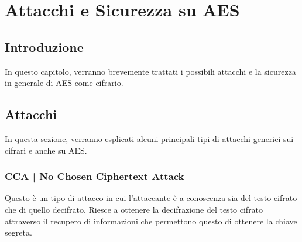 
\chapter{Attacchi e Sicurezza su AES} %




\section{Introduzione}

 

\textsf{\small In questo capitolo, verranno brevemente trattati i possibili attacchi e la sicurezza in generale di AES come cifrario.}


\section{Attacchi}

 

\textsf{\small In questa sezione, verranno esplicati alcuni principali tipi di attacchi generici sui cifrari e anche su AES.} %

\subsection{CCA | No Chosen Ciphertext Attack}

  

\textsf{\small Questo è un tipo di attacco in cui l'attaccante è a conoscenza sia del testo cifrato che di quello decifrato. Riesce a ottenere la decifrazione del testo cifrato attraverso il recupero di informazioni che permettono questo di ottenere la chiave segreta.}

